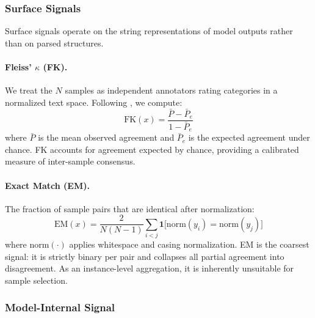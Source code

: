 \subsubsection{Surface Signals}

Surface signals operate on the string representations of model outputs rather than on parsed structures.

\paragraph{Fleiss' $\kappa$ (FK).}
We treat the $N$ samples as independent annotators rating categories in a normalized text space.
Following \citet{fleiss1971agreement}, we compute:
\begin{equation}
    \mathrm{FK}(x) = \frac{\bar{P} - \bar{P}_e}{1 - \bar{P}_e}
    \label{eq:fk}
\end{equation}
where $\bar{P}$ is the mean observed agreement and $\bar{P}_e$ is the expected agreement under chance.
FK accounts for agreement expected by chance, providing a calibrated measure of inter-sample consensus.

\paragraph{Exact Match (EM).}
The fraction of sample pairs that are identical after normalization:
\begin{equation}
    \mathrm{EM}(x) = \frac{2}{N(N-1)} \sum_{i < j} \mathbf{1}\big[\mathrm{norm}(y_i) = \mathrm{norm}(y_j)\big]
    \label{eq:em}
\end{equation}
where $\mathrm{norm}(\cdot)$ applies whitespace and casing normalization.
EM is the coarsest signal: it is strictly binary per pair and collapses all partial agreement into disagreement.
As an instance-level aggregation, it is inherently unsuitable for sample selection.

\subsubsection{Model-Internal Signal}

